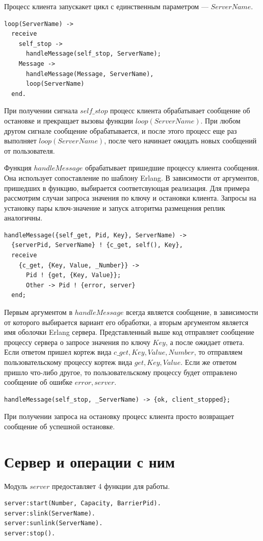 		Процесс клиента запускакет цикл с единственным параметром --- $ServerName$. 
		\begin{lstlisting}
loop(ServerName) -> 
  receive
    self_stop ->
      handleMessage(self_stop, ServerName);
    Message -> 
      handleMessage(Message, ServerName), 
      loop(ServerName)
  end.
		\end{lstlisting}
		При получении сигнала $self\_stop$ процесс клиента обрабатывает сообщение об остановке и прекращает вызовы функции $loop(ServerName)$. При любом другом сигнале 
		сообщение обрабатывается, и после этого процесс еще раз выполняет $loop(ServerName)$, после чего начинает ожидать новых сообщений от пользователя.

		Функция $handleMessage$ обрабатывает пришедшие процессу клиента сообщения. Она использует сопоставление по шаблону Erlang. В зависимости от аргументов, пришедших в функцию,
		выбирается соответсвующая реализация. Для примера рассмотрим случаи запроса значения по ключу и остановки клиента. Запросы на установку пары ключ-значение и запуск
		алгоритма размещения реплик аналогичны.
		\begin{lstlisting}
handleMessage({self_get, Pid, Key}, ServerName) ->
  {serverPid, ServerName} ! {c_get, self(), Key},
  receive
    {c_get, {Key, Value, _Number}} ->
      Pid ! {get, {Key, Value}};
      Other -> Pid ! {error, server}
  end;
		\end{lstlisting} 
		Первым аргументом в $handleMessage$ всегда является сообщение, в зависимости от которого выбирается вариант его обработки, а вторым аргументом является имя оболочки 
		Erlang сервера. Представленный выше код отправляет сообщение процессу сервера о запросе значения по ключу $Key$, а после ожидает ответа. Если ответом пришел кортеж вида
		${c\_get, {Key, Value, Number}}$, то отправляем пользовательскому процессу кортеж вида ${get, {Key, Value}}$. Если же ответом пришло что-либо другое, то пользовательскому 
		процессу будет отправлено сообщение об ошибке ${error, server}$. 

		\begin{lstlisting}
handleMessage(self_stop, _ServerName) -> {ok, client_stopped};			
		\end{lstlisting}
		При получении запроса на остановку процесс клиента просто возвращает сообщение об успешной остановке.

	\section{Сервер и операции с ним}
		Модуль $server$ предоставляет 4 функции для работы.
		\begin{lstlisting}
server:start(Number, Capacity, BarrierPid).
server:slink(ServerName).
server:sunlink(ServerName).
server:stop().			
		\end{lstlisting}

